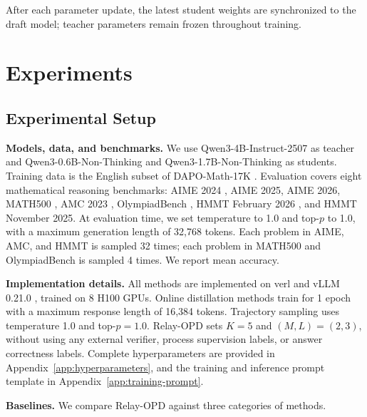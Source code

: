 \documentclass{article} %
\begin{document}
After each parameter update, the latest student weights are synchronized to the draft model; teacher parameters remain frozen throughout training.\par

\section{Experiments}\label{sec:experiments}

\subsection{Experimental Setup}\label{subsec:setup}

\textbf{Models, data, and benchmarks.} We use Qwen3-4B-Instruct-2507 \citep{yang2025qwen3} as teacher and Qwen3-0.6B-Non-Thinking and Qwen3-1.7B-Non-Thinking as students. Training data is the English subset of DAPO-Math-17K \citep{yu2026dapo}. Evaluation covers eight mathematical reasoning benchmarks: AIME 2024 \citep{aime2024}, AIME 2025, AIME 2026, MATH500 \citep{hendrycks2021measuring,lightman2024let}, AMC 2023 \citep{amc2023}, OlympiadBench \citep{he2024olympiadbench}, HMMT February 2026 \citep{hmmt25}, and HMMT November 2025. At evaluation time, we set temperature to 1.0 and top-$p$ to 1.0, with a maximum generation length of 32,768 tokens. Each problem in AIME, AMC, and HMMT is sampled 32 times; each problem in MATH500 and OlympiadBench is sampled 4 times. We report mean accuracy.\par

\textbf{Implementation details.} All methods are implemented on verl \citep{sheng2025hybridflow} and vLLM 0.21.0 \citep{kwon2023efficient}, trained on 8 H100 GPUs. Online distillation methods train for 1 epoch with a maximum response length of 16,384 tokens. Trajectory sampling uses temperature 1.0 and top-$p=1.0$. Relay-OPD sets $K=5$ and $(M,L)=(2,3)$, without using any external verifier, process supervision labels, or answer correctness labels. Complete hyperparameters are provided in Appendix~\ref{app:hyperparameters}, and the training and inference prompt template in Appendix~\ref{app:training-prompt}.\par

\textbf{Baselines.} We compare Relay-OPD against three categories of methods.\par
\end{document}
